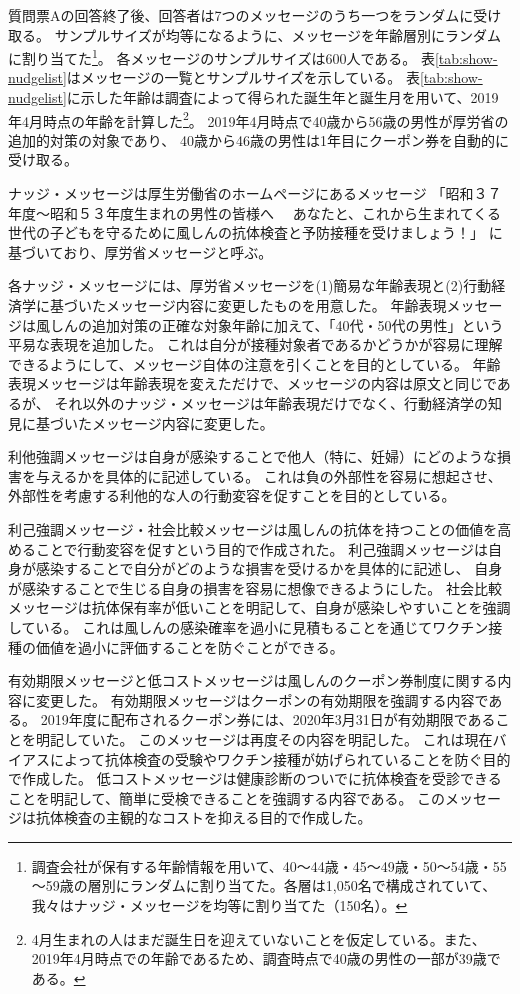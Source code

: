 \documentclass[
  11pt,
  a4paper,
]{article}
\begin{document}
質問票Aの回答終了後、回答者は7つのメッセージのうち一つをランダムに受け取る。
サンプルサイズが均等になるように、メッセージを年齢層別にランダムに割り当てた\footnote{調査会社が保有する年齢情報を用いて、40～44歳・45～49歳・50～54歳・55～59歳の層別にランダムに割り当てた。各層は1,050名で構成されていて、我々はナッジ・メッセージを均等に割り当てた（150名）。}。
各メッセージのサンプルサイズは600人である。
表\ref{tab:show-nudgelist}はメッセージの一覧とサンプルサイズを示している。
表\ref{tab:show-nudgelist}に示した年齢は調査によって得られた誕生年と誕生月を用いて、2019年4月時点の年齢を計算した\footnote{4月生まれの人はまだ誕生日を迎えていないことを仮定している。また、2019年4月時点での年齢であるため、調査時点で40歳の男性の一部が39歳である。}。
2019年4月時点で40歳から56歳の男性が厚労省の追加的対策の対象であり、
40歳から46歳の男性は1年目にクーポン券を自動的に受け取る。

ナッジ・メッセージは厚生労働省のホームページにあるメッセージ
「昭和３７年度～昭和５３年度生まれの男性の皆様へ　
あなたと、これから生まれてくる世代の子どもを守るために風しんの抗体検査と予防接種を受けましょう！」
に基づいており、厚労省メッセージと呼ぶ。

各ナッジ・メッセージには、厚労省メッセージを(1)簡易な年齢表現と(2)行動経済学に基づいたメッセージ内容に変更したものを用意した。
年齢表現メッセージは風しんの追加対策の正確な対象年齢に加えて、「40代・50代の男性」という平易な表現を追加した。
これは自分が接種対象者であるかどうかが容易に理解できるようにして、メッセージ自体の注意を引くことを目的としている。
年齢表現メッセージは年齢表現を変えただけで、メッセージの内容は原文と同じであるが、
それ以外のナッジ・メッセージは年齢表現だけでなく、行動経済学の知見に基づいたメッセージ内容に変更した。

利他強調メッセージは自身が感染することで他人（特に、妊婦）にどのような損害を与えるかを具体的に記述している。
これは負の外部性を容易に想起させ、外部性を考慮する利他的な人の行動変容を促すことを目的としている。

利己強調メッセージ・社会比較メッセージは風しんの抗体を持つことの価値を高めることで行動変容を促すという目的で作成された。
利己強調メッセージは自身が感染することで自分がどのような損害を受けるかを具体的に記述し、
自身が感染することで生じる自身の損害を容易に想像できるようにした。
社会比較メッセージは抗体保有率が低いことを明記して、自身が感染しやすいことを強調している。
これは風しんの感染確率を過小に見積もることを通じてワクチン接種の価値を過小に評価することを防ぐことができる。

有効期限メッセージと低コストメッセージは風しんのクーポン券制度に関する内容に変更した。
有効期限メッセージはクーポンの有効期限を強調する内容である。
2019年度に配布されるクーポン券には、2020年3月31日が有効期限であることを明記していた。
このメッセージは再度その内容を明記した。
これは現在バイアスによって抗体検査の受験やワクチン接種が妨げられていることを防ぐ目的で作成した。
低コストメッセージは健康診断のついでに抗体検査を受診できることを明記して、簡単に受検できることを強調する内容である。
このメッセージは抗体検査の主観的なコストを抑える目的で作成した。
\end{document}
